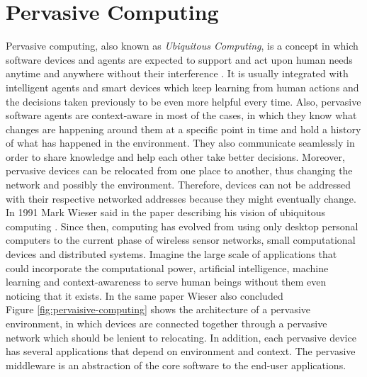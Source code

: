 \section{Pervasive Computing} 
 Pervasive computing, also known as \textit{Ubiquitous Computing}, is a concept in which software devices and agents are expected to support and act upon human needs anytime and anywhere without their interference \cite{Chen:2003:OCP:991804.991806}. It is usually integrated with intelligent agents and smart devices which keep learning from human actions and the decisions taken previously to be even more helpful every time. Also, pervasive software agents are context-aware in most of the cases, in which they know what changes are happening around them at a specific point in time and hold a history of what has happened in the environment. They also communicate seamlessly in order to share knowledge and help each other take better decisions. Moreover, pervasive devices can be relocated from one place to another, thus changing the network and possibly the environment. Therefore, devices can not be addressed with their respective networked addresses because they might eventually change. \\

\noindent In 1991 Mark Wieser said in the paper describing his vision of ubiquitous computing   \cite{weiser1991ubicomp}. Since then, computing has evolved from using only desktop personal computers to the current phase of wireless sensor networks, small computational devices and distributed systems. Imagine the large scale of applications that could incorporate the computational power, artificial intelligence, machine learning and context-awareness to serve human beings without them even noticing that it exists. In the same paper Wieser also concluded \\



\noindent Figure \ref{fig:pervaisive-computing} shows the architecture of a pervasive environment, in which devices are connected together through a pervasive network which should be lenient to relocating. In addition, each pervasive device has several applications that depend on environment and  context. The pervasive middleware is an abstraction of the core software to the end-user applications.

